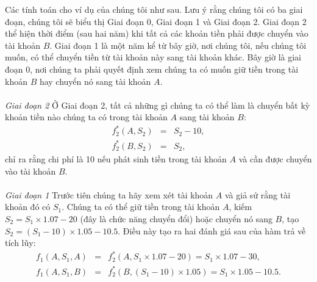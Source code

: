 \documentclass[12pt,a4paper]{report}
\begin{document}
		Các tính toán cho ví dụ của chúng tôi như sau. Lưu ý rằng chúng tôi có ba giai đoạn, chúng tôi sẽ biểu thị Giai đoạn 0, Giai đoạn 1 và Giai đoạn 2. Giai đoạn 2 thể hiện thời điểm (sau hai năm) khi tất cả các khoản tiền phải được chuyển vào tài khoản $B$. Giai đoạn 1 là một năm kể từ bây giờ, nơi chúng tôi, nếu chúng tôi muốn, có thể chuyển tiền từ tài khoản này sang tài khoản khác. Bây giờ là giai đoạn 0, nơi chúng ta phải quyết định xem chúng ta có muốn giữ tiền trong tài khoản $B$ hay chuyển nó sang tài khoản $A$. \\\\ 
		\textit{Giai đoạn 2} Ở Giai đoạn 2, tất cả những gì chúng ta có thể làm là chuyển bất kỳ khoản tiền nào chúng ta có trong tài khoản $A$ sang tài khoản $B$: \begin{eqnarray}
			f_2^*(A, S_2) &=& S_2 - 10, \nonumber \\f_2^*(B, S_2) &=& S_2, \nonumber
		\end{eqnarray}
		chỉ ra rằng chi phí là 10 nếu phát sinh tiền trong tài khoản $A$ và cần được chuyển vào tài khoản $B$.\\\\
		\textit{Giai đoạn 1} Trước tiên chúng ta hãy xem xét tài khoản $A$ và giả sử rằng tài khoản đó có $S_1$. Chúng ta có thể giữ tiền trong tài khoản $A$, kiếm $S_2 = S_1 \times 1.07 - 20$ (đây là chức năng chuyển đổi) hoặc chuyển nó sang $B$, tạo $S_2 = (S_1 - 10) \times 1.05 - 10.5$. Điều này tạo ra hai đánh giá sau của hàm trả về tích lũy: \begin{eqnarray}
			f_1(A, S_1, A) &=& f_2^*(A, S_1 \times 1.07 - 20) = S_1 \times 1.07 - 30, \nonumber \\ f_1(A, S_1, B) &=& f_2^*(B, (S_1 - 10) \times 1.05) = S_1 \times 1.05 - 10.5. \nonumber
		\end{eqnarray}
\end{document}
